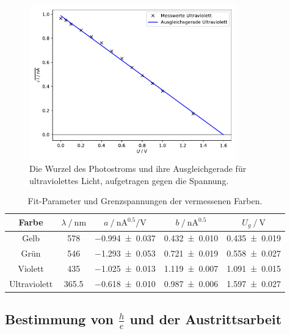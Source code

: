 \begin{figure}[H]
    \centering
    \includegraphics[width=0.8\textwidth]{build/plot_sqrt_ultraviolett.pdf}
    \caption{Die Wurzel des Photostroms und ihre Ausgleichgerade für ultraviolettes Licht, aufgetragen gegen die Spannung.}
    \label{fig:plot_sqrt_ultraviolett}
\end{figure}

\begin{table}
  \centering
  \caption{Fit-Parameter und Grenzspannungen der vermessenen Farben.}
  \label{tab:grenzspannungen}
  \begin{tabular}{c S c c c}
  \toprule
  Farbe &
  $\lambda \mathbin{/} \si{\nano\meter}$ &
  $a \mathbin{/} \si{\nano\ampere\tothe{0.5}\per\volt}$ &
  $b \mathbin{/} \si{\nano\ampere\tothe{0.5}}$ &
  $U_g \mathbin{/} \si{\volt}$ \\
  \midrule
  Gelb         & 578   & \num{-0.994 \pm 0.037} & \num{0.432 \pm 0.010} & \num{0.435 \pm 0.019} \\
  Grün         & 546   & \num{-1.293 \pm 0.053} & \num{0.721 \pm 0.019} & \num{0.558 \pm 0.027} \\
  Violett      & 435   & \num{-1.025 \pm 0.013} & \num{1.119 \pm 0.007} & \num{1.091 \pm 0.015} \\
  Ultraviolett & 365.5 & \num{-0.618 \pm 0.010} & \num{0.987 \pm 0.006} & \num{1.597 \pm 0.027} \\
  \bottomrule
  \end{tabular}
\end{table}

\subsection{Bestimmung von \texorpdfstring{$\frac{h}{e}$}{h/e} und der Austrittsarbeit}
\label{sec:auswertung:gelb_full}

